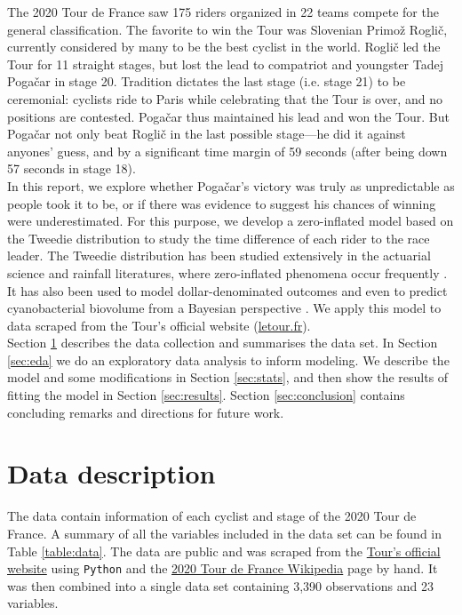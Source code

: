\documentclass[aos,preprint]{imsart}
\begin{document}
The 2020 Tour de France saw 175 riders organized in 22 teams compete for the general classification. The favorite to win the Tour was Slovenian Primož Roglič, currently considered by many to be the best cyclist in the world. Roglič led the Tour for 11 straight stages, but lost the lead to compatriot and youngster Tadej Pogačar in stage 20. Tradition dictates the last stage (i.e. stage 21) to be ceremonial: cyclists ride to Paris while celebrating that the Tour is over, and no positions are contested. Pogačar thus maintained his lead and won the Tour. But Pogačar not only beat Roglič in the last possible stage---he did it against anyones' guess, and by a significant time margin of 59 seconds (after being down 57 seconds in stage 18). \\


In this report, we explore whether Pogačar's victory was truly as unpredictable as people took it to be, or if there was evidence to suggest his chances of winning were underestimated. For this purpose, we develop a zero-inflated model based on the Tweedie distribution to study the time difference of each rider to the race leader. The Tweedie distribution has been studied extensively in the actuarial science and rainfall literatures, where zero-inflated phenomena occur frequently \citep[see][and references therein]{jorgensen1994, withers2011}. It has also been used to model dollar-denominated outcomes \citep{lauderdale2012} and even to predict cyanobacterial biovolume from a Bayesian perspective \citep{haakonsson2020}. We apply this model to data scraped from the Tour's official website (\url{letour.fr}). \\



Section \ref{sec:data} describes the data collection and summarises the data set. In Section \ref{sec:eda} we do an exploratory data analysis to inform modeling. We describe the model and some modifications in Section \ref{sec:stats}, and then show the results of fitting the model in Section \ref{sec:results}. Section \ref{sec:conclusion} contains concluding remarks and directions for future work.


\section{Data description} \label{sec:data}


The data contain information of each cyclist and stage of the 2020 Tour de France. A summary of all the variables included in the data set can be found in Table \ref{table:data}. The data are public and was scraped from the \href{letour.fr}{Tour's official website} using \texttt{Python} and the \href{https://en.wikipedia.org/wiki/2020_Tour_de_France}{2020 Tour de France Wikipedia} page by hand. It was then combined into a single data set containing 3,390 observations and 23 variables. \\
\end{document}
